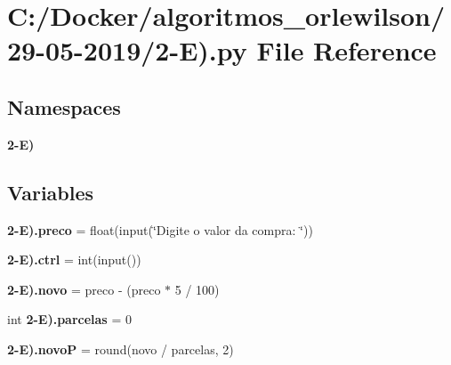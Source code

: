 \section{C\+:/\+Docker/algoritmos\+\_\+orlewilson/29-\/05-\/2019/2-\/E).py File Reference}
\label{2-_e_08_8py}
\subsection*{Namespaces}
\begin{DoxyCompactItemize}
\item 
 \textbf{ 2-\/\+E)}
\end{DoxyCompactItemize}
\subsection*{Variables}
\begin{DoxyCompactItemize}
\item 
\textbf{ 2-\/\+E).\+preco} = float(input(\char`\"{}Digite o valor da compra\+: \char`\"{}))
\item 
\textbf{ 2-\/\+E).\+ctrl} = int(input())
\item 
\textbf{ 2-\/\+E).\+novo} = preco -\/ (preco $\ast$ 5 / 100)
\item 
int \textbf{ 2-\/\+E).\+parcelas} = 0
\item 
\textbf{ 2-\/\+E).\+novoP} = round(novo / parcelas, 2)
\end{DoxyCompactItemize}
